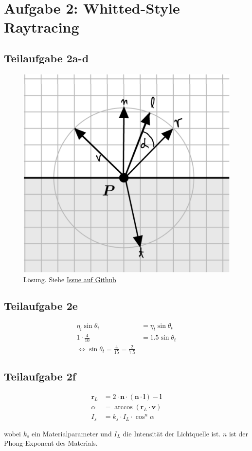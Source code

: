 \documentclass[a4paper]{scrartcl}
\begin{document}
\section*{Aufgabe 2: Whitted-Style Raytracing}
\subsection*{Teilaufgabe 2a-d}
\begin{figure}[h]
	\includegraphics*[width=0.5\linewidth, keepaspectratio]{2a.png}
	\caption{Lösung. Siehe \href{https://github.com/MartinThoma/KIT-Musterloesungen/issues/10}{Issue auf Github}}
	\label{fig:2a}
\end{figure}

\subsection*{Teilaufgabe 2e}
\begin{align}
    \eta_i \sin \theta_i &= \eta_t \sin \theta_t\\
    1 \cdot \frac{4}{10} &= 1.5 \sin \theta_t\\
    \Leftrightarrow \sin \theta_t = \frac{4}{15} = \frac{2}{7.5}
\end{align}

\subsection*{Teilaufgabe 2f}
\begin{align}
	\mathbf{r}_L &= 2 \cdot \mathbf{n} \cdot (\mathbf{n} \cdot \mathbf{l}) - \mathbf{l}\\
	\alpha       &= \arccos (\mathbf{r}_L \cdot \mathbf{v})\\
    I_s          &= k_s \cdot I_L \cdot \cos^n \alpha
\end{align}

wobei $k_s$ ein Materialparameter und $I_L$ die Intensität der Lichtquelle ist.
$n$ ist der Phong-Exponent des Materials.
\end{document}

